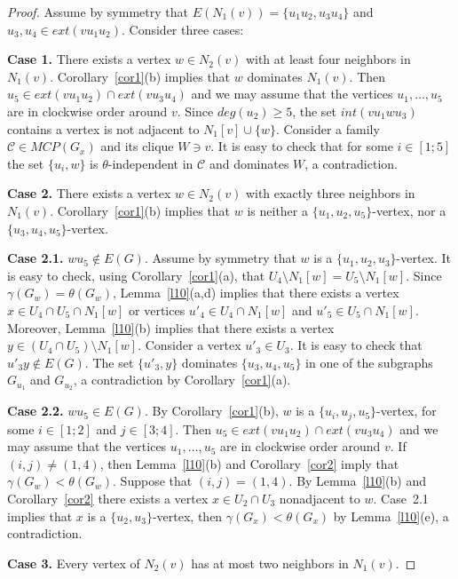 \documentclass[12pt]{article}
\begin{document}
\begin{proof}
Assume by symmetry that $E(N_1(v)) = \{u_1u_2,u_3u_4\}$ and $u_3,u_4 \in ext(vu_1u_2)$. Consider three cases:

\textbf{Case 1.} There exists a vertex $w \in N_2(v)$ with at least four neighbors in $N_1(v)$. Corollary~\ref{cor1}(b) implies that $w$ dominates $N_1(v)$. Then $u_5 \in ext(vu_1u_2) \cap ext(vu_3u_4)$ and we may assume that the vertices $u_1,\ldots,u_5$ are in clockwise order around $v$. Since $deg(u_2) \geq 5$, the set $int(vu_1wu_3)$ contains a vertex is not adjacent to $N_1[v] \cup \{w\}$. Consider a family $\mathcal{C} \in MCP(G_x)$ and its clique $W \ni v$. It is easy to check that for some $i \in [1;5]$ the set $\{u_i,w\}$ is $\theta$-independent in $\mathcal{C}$ and dominates $W$, a contradiction.

\textbf{Case 2.} There exists a vertex $w \in N_2(v)$ with exactly three neighbors in $N_1(v)$. Corollary~\ref{cor1}(b) implies that $w$ is neither a $\{u_1,u_2,u_5\}$-vertex, nor a $\{u_3,u_4,u_5\}$-vertex.

\textbf{Case 2.1.} $wu_5 \notin E(G)$. Assume by symmetry that $w$ is a $\{u_1,u_2,u_3\}$-vertex. It is easy to check, using Corollary~\ref{cor1}(a), that $U_4 \setminus N_1[w] = U_5 \setminus N_1[w]$. Since $\gamma(G_w) = \theta(G_w)$, Lemma~\ref{l10}(a,d) implies that there exists a vertex $x \in U_4 \cap U_5 \cap N_1[w]$ or vertices $u'_4 \in U_4 \cap N_1[w]$ and $u'_5 \in U_5 \cap N_1[w]$. Moreover, Lemma~\ref{l10}(b) implies that there exists a vertex $y \in (U_4 \cap U_5) \setminus N_1[w]$. Consider a vertex $u'_3 \in U_3$. It is easy to check that $u'_3y \notin E(G)$. The set $\{u'_3,y\}$ dominates $\{u_3,u_4,u_5\}$ in one of the subgraphs $G_{u_1}$ and $G_{u_2}$, a contradiction by Corollary~\ref{cor1}(a).

\textbf{Case 2.2.} $wu_5 \in E(G)$. By Corollary~\ref{cor1}(b), $w$ is a $\{u_i,u_j,u_5\}$-vertex, for some $i \in [1;2]$ and $j \in [3;4]$. Then $u_5 \in ext(vu_1u_2) \cap ext(vu_3u_4)$ and we may assume that the vertices $u_1,\ldots,u_5$ are in clockwise order around $v$. If $(i,j) \neq (1,4)$, then Lemma~\ref{l10}(b) and Corollary~\ref{cor2} imply that $\gamma(G_w) < \theta(G_w)$. Suppose that $(i,j) = (1,4)$. By Lemma~\ref{l10}(b) and Corollary~\ref{cor2} there exists a vertex $x \in U_2 \cap U_3$ nonadjacent to $w$. Case~2.1 implies that $x$ is a $\{u_2,u_3\}$-vertex, then $\gamma(G_x) < \theta(G_x)$ by Lemma~\ref{l10}(e), a contradiction.

\textbf{Case 3.} Every vertex of $N_2(v)$ has at most two neighbors in $N_1(v)$.


\end{proof}
\end{document}

